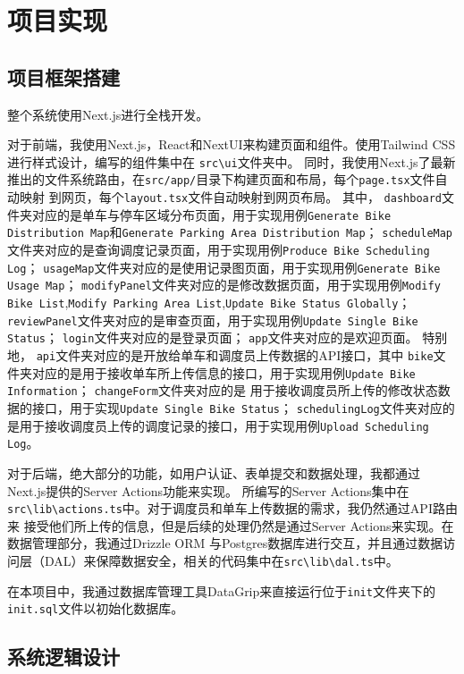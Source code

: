 \chapter{项目实现}
\thispagestyle{empty}
\section{项目框架搭建}
整个系统使用Next.js进行全栈开发。

对于前端，我使用Next.js，React和NextUI来构建页面和组件。使用Tailwind CSS进行样式设计，编写的组件集中在 \verb|src\ui|文件夹中。
同时，我使用Next.js了最新推出的文件系统路由，在\verb|src/app/|目录下构建页面和布局，每个\verb|page.tsx|文件自动映射
到网页，每个\verb|layout.tsx|文件自动映射到网页布局。
其中， \texttt{dashboard}文件夹对应的是单车与停车区域分布页面，用于实现用例\texttt{Generate Bike Distribution Map}和\texttt{Generate Parking Area Distribution Map}；
\texttt{scheduleMap}文件夹对应的是查询调度记录页面，用于实现用例\texttt{Produce Bike Scheduling Log}； \texttt{usageMap}文件夹对应的是使用记录图页面，用于实现用例\texttt{Generate Bike Usage Map}；
\texttt{modifyPanel}文件夹对应的是修改数据页面，用于实现用例\texttt{Modify Bike List},\texttt{Modify Parking Area List},\texttt{Update Bike Status Globally}； \texttt{reviewPanel}文件夹对应的是审查页面，用于实现用例\texttt{Update Single Bike Status}； \texttt{login}文件夹对应的是登录页面； \texttt{app}文件夹对应的是欢迎页面。
特别地， \texttt{api}文件夹对应的是开放给单车和调度员上传数据的API接口，其中 \texttt{bike}文件夹对应的是用于接收单车所上传信息的接口，用于实现用例\texttt{Update Bike Information}； \texttt{changeForm}文件夹对应的是
用于接收调度员所上传的修改状态数据的接口，用于实现\texttt{Update Single Bike Status}； \texttt{schedulingLog}文件夹对应的是用于接收调度员上传的调度记录的接口，用于实现用例\texttt{Upload Scheduling Log}。

对于后端，绝大部分的功能，如用户认证、表单提交和数据处理，我都通过Next.js提供的Server Actions功能来实现。
所编写的Server Actions集中在\verb|src\lib\actions.ts|中。对于调度员和单车上传数据的需求，我仍然通过API路由来
接受他们所上传的信息，但是后续的处理仍然是通过Server Actions来实现。在数据管理部分，我通过Drizzle ORM
与Postgres数据库进行交互，并且通过数据访问层（DAL）来保障数据安全，相关的代码集中在\verb|src\lib\dal.ts|中。

在本项目中，我通过数据库管理工具DataGrip来直接运行位于\texttt{init}文件夹下的\texttt{init.sql}文件以初始化数据库。

\section{系统逻辑设计}
